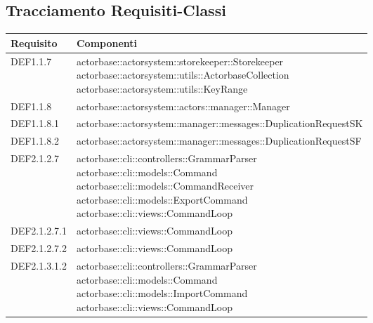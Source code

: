 \documentclass{scalatekids-article}
\begin{document}
\subsection{Tracciamento Requisiti-Classi}
\begin{longtable}[H]{|p{4.5cm}|p{13cm}|}
  \hline
  \textbf{Requisito} & \textbf{Componenti}\\
  \hline
  DEF1.1.7 & \multiLineCell[t]{actorbase::actorsystem::storekeeper::Storekeeper\\actorbase::actorsystem::utils::ActorbaseCollection\\actorbase::actorsystem::utils::KeyRange\\}\\
  \hline
  DEF1.1.8 & \multiLineCell[t]{actorbase::actorsystem::actors::manager::Manager\\}\\
  \hline
  DEF1.1.8.1 & \multiLineCell[t]{actorbase::actorsystem::manager::messages::DuplicationRequestSK\\}\\
  \hline
  DEF1.1.8.2 & \multiLineCell[t]{actorbase::actorsystem::manager::messages::DuplicationRequestSF\\}\\
  \hline
  DEF2.1.2.7 & \multiLineCell[t]{actorbase::cli::controllers::GrammarParser\\actorbase::cli::models::Command\\actorbase::cli::models::CommandReceiver\\actorbase::cli::models::ExportCommand\\actorbase::cli::views::CommandLoop\\}\\
  \hline
  DEF2.1.2.7.1 & \multiLineCell[t]{actorbase::cli::views::CommandLoop\\}\\
  \hline
  DEF2.1.2.7.2 & \multiLineCell[t]{actorbase::cli::views::CommandLoop\\}\\
  \hline
  DEF2.1.3.1.2 & \multiLineCell[t]{actorbase::cli::controllers::GrammarParser\\actorbase::cli::models::Command\\actorbase::cli::models::ImportCommand\\actorbase::cli::views::CommandLoop\\}\\

\end{longtable}
\end{document}
